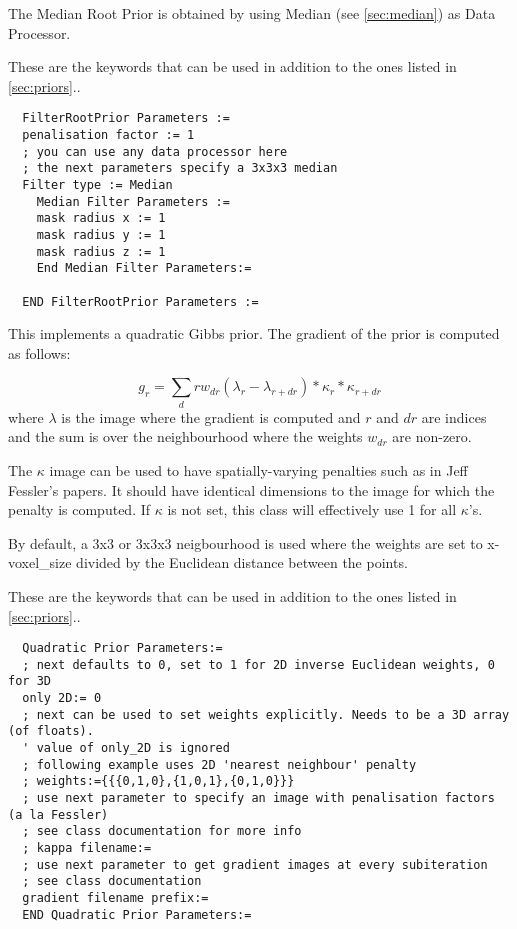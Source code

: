 \documentclass{article}
\begin{document}
The Median Root Prior is obtained by using Median (see \ref{sec:median}) 
as Data Processor.

{ 
}

These are the keywords that can be used in addition to the ones listed in \ref{sec:priors}..
  \begin{verbatim}
  FilterRootPrior Parameters :=
  penalisation factor := 1
  ; you can use any data processor here
  ; the next parameters specify a 3x3x3 median
  Filter type := Median
    Median Filter Parameters :=
    mask radius x := 1   
    mask radius y := 1
    mask radius z := 1
    End Median Filter Parameters:=

  END FilterRootPrior Parameters :=
 \end{verbatim}

{ 
}

This implements a quadratic Gibbs prior. The gradient of the prior is computed as follows:
  
 \[
  g_r = \sum_dr w_{dr} (\lambda_r - \lambda_{r+dr}) * \kappa_r * \kappa_{r+dr}
  \]
  \noindent where $\lambda$ is the image where the gradient is computed
   and $r$ and $dr$ are indices and the sum
  is over the neighbourhood where the weights $w_{dr}$ are non-zero.

  The $\kappa$ image can be used to have spatially-varying penalties such as in 
  Jeff Fessler's papers. It should have identical dimensions to the image for which the
  penalty is computed. If $\kappa$ is not set, this class will effectively
  use 1 for all $\kappa$'s.

  By default, a 3x3 or 3x3x3 neigbourhood is used where the weights are set to 
  x-voxel\_size divided by the Euclidean distance between the points.
 
{ 
}
  These are the keywords that can be used in addition to the ones listed in \ref{sec:priors}..
  \begin{verbatim}
  Quadratic Prior Parameters:=
  ; next defaults to 0, set to 1 for 2D inverse Euclidean weights, 0 for 3D 
  only 2D:= 0
  ; next can be used to set weights explicitly. Needs to be a 3D array (of floats).
  ' value of only_2D is ignored
  ; following example uses 2D 'nearest neighbour' penalty
  ; weights:={{{0,1,0},{1,0,1},{0,1,0}}}
  ; use next parameter to specify an image with penalisation factors (a la Fessler)
  ; see class documentation for more info
  ; kappa filename:=
  ; use next parameter to get gradient images at every subiteration
  ; see class documentation
  gradient filename prefix:= 
  END Quadratic Prior Parameters:=
  \end{verbatim}
\end{document}
